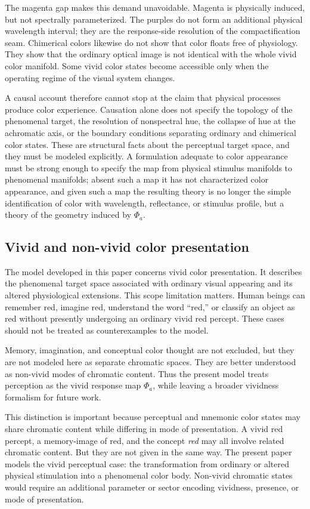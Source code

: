 \documentclass[preprint,12pt,authoryear]{elsarticle}
\theoremstyle{plain}
\theoremstyle{definition}
\theoremstyle{remark}
\begin{document}
The magenta gap makes this demand unavoidable. Magenta is physically induced, but not spectrally parameterized. The purples do not form an additional physical wavelength interval; they are the response-side resolution of the compactification seam. Chimerical colors likewise do not show that color floats free of physiology. They show that the ordinary optical image is not identical with the whole vivid color manifold. Some vivid color states become accessible only when the operating regime of the visual system changes.

A causal account therefore cannot stop at the claim that physical processes produce color experience. Causation alone does not specify the topology of the phenomenal target, the resolution of nonspectral hue, the collapse of hue at the achromatic axis, or the boundary conditions separating ordinary and chimerical color states. These are structural facts about the perceptual target space, and they must be modeled explicitly. A formulation adequate to color appearance must be strong enough to specify the map from physical stimulus manifolds to phenomenal manifolds; absent such a map it has not characterized color appearance, and given such a map the resulting theory is no longer the simple identification of color with wavelength, reflectance, or stimulus profile, but a theory of the geometry induced by $\Phi_a$.

\subsection{Vivid and non-vivid color presentation}
\label{subsec:vivid-nonvivid-color}

\noindent The model developed in this paper concerns vivid color presentation. It describes the phenomenal target space associated with ordinary visual appearing and its altered physiological extensions. This scope limitation matters. Human beings can remember red, imagine red, understand the word ``red,'' or classify an object as red without presently undergoing an ordinary vivid red percept. These cases should not be treated as counterexamples to the model.

Memory, imagination, and conceptual color thought are not excluded, but they are not modeled here as separate chromatic spaces. They are better understood as non-vivid modes of chromatic content. Thus the present model treats perception as the vivid response map $\Phi_a$, while leaving a broader vividness formalism for future work.

This distinction is important because perceptual and mnemonic color states may share chromatic content while differing in mode of presentation. A vivid red percept, a memory-image of red, and the concept \emph{red} may all involve related chromatic content. But they are not given in the same way. The present paper models the vivid perceptual case: the transformation from ordinary or altered physical stimulation into a phenomenal color body. Non-vivid chromatic states would require an additional parameter or sector encoding vividness, presence, or mode of presentation.
\end{document}
